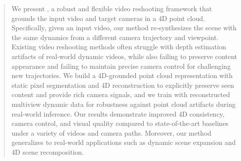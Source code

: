 \begin{abstract}

We present \methodname, a robust and flexible video reshooting framework that grounds the input video and target cameras in a 4D point cloud. Specifically, given an input video, our method re-synthesizes the scene with the same dynamics from a different camera trajectory and viewpoint. Existing video reshooting methods often struggle with depth estimation artifacts of real-world dynamic videos, while also failing to preserve content appearance and failing to maintain precise camera control for challenging new trajectories. We build a 4D-grounded point cloud representation with static pixel segmentation and 4D reconstruction to explicitly preserve seen content and provide rich camera signals, and we train with reconstructed multiview dynamic data for robustness against point cloud artifacts during real-world inference. Our results demonstrate improved 4D consistency, camera control, and visual quality compared to state-of-the-art baselines under a variety of videos and camera paths. Moreover, our method generalizes to real-world applications such as dynamic scene expansion and 4D scene recomposition.

\end{abstract}